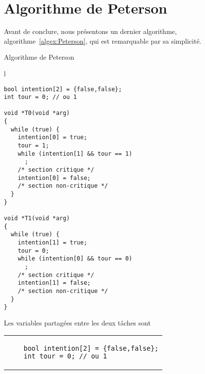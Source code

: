 \section{Algorithme de Peterson}
Avant de conclure, nous présentons un dernier algorithme, algorithme~\ref{algex:Peterson}, qui est remarquable par sa simplicité.
\begin{algorithm}[!ht]
  \caption{Algorithme de Peterson}\label{algex:Peterson}
  \centering
  \begin{tabular}{l}
    \lstset{language=C++}
    \begin{lstlisting}
bool intention[2] = {false,false};
int tour = 0; // ou 1

void *T0(void *arg)
{
  while (true) {
    intention[0] = true;
    tour = 1;
    while (intention[1] && tour == 1)
      ;
    /* section critique */
    intention[0] = false;
    /* section non-critique */
  }
}

void *T1(void *arg)
{
  while (true) {
    intention[1] = true;
    tour = 0;
    while (intention[0] && tour == 0)
      ;
    /* section critique */
    intention[1] = false;
    /* section non-critique */
  }
}
\end{lstlisting}
  \end{tabular}

\end{algorithm}

Les variables partagées entre les deux tâches sont
\centering
\begin{tabular}{l}
  \lstset{language=C++}
  \begin{lstlisting}
    bool intention[2] = {false,false};
    int tour = 0; // ou 1
\end{lstlisting}
\end{tabular}

